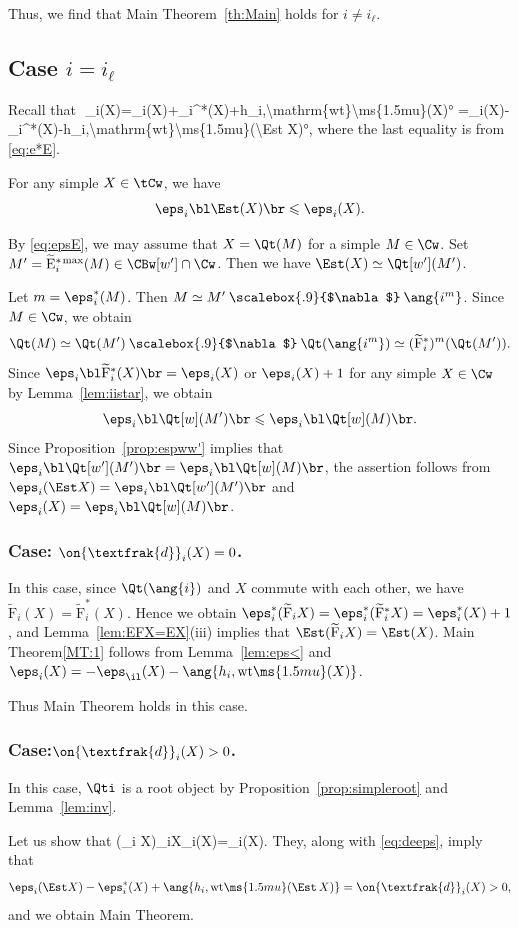 \documentclass[12pt,leqno]{amsart}%
\renewcommand{\le}{\leqslant}
\theoremstyle{plain}
\theoremstyle{definition}
\newcommand{\hconv}{\mathbin{\scalebox{.9}{$\nabla$}}}
\newcommand{\de}{\on{\textfrak{d}}}
\newcommand{\wt}{\mathrm{wt}\ms{1.5mu}} 		%
\newcommand{\tF}{\widetilde{\mathrm{F}}} 		%
\newcommand{\tEsm}{\widetilde{\mathrm{E}}^{*{ \hskip 0.1em  \rm max}}}  		%
\numberwithin{equation}{section}
\begin{document}
Thus, we find that Main Theorem~\ref{th:Main} holds for $i\not=i_\ell$.


\subsection{Case $i=i_\ell$}
 Recall that
\eq
\,\,\qquad\de_i(X)=\eps_i(X)+\eps_i^*(X)+\ang{h_i,\wt(X)}
=\eps_i(X)-\bl\eps_i^*(X)-\ang{h_i,\wt(\Est X)}\br,
\label{eq:deeps}
\eneq
where the last equality is from \eqref{eq:e*E}.

\Lemma\label{lem:eps<}
For any simple $X\in\tCw$, we have
$$\eps_i\bl\Est(X)\br\le\eps_i(X).$$
\enlemma
\Proof

By \eqref{eq:epsE}, we may assume that $X=\Qt(M)$ for a simple $M\in\Cw$.
Set $M'=\tEsm_{i}(M)\in\CBw[w']\cap\Cw$.
Then we have $\Est(X)\simeq\Qt[w'](M')$.

Let $m=\eps_i^*(M)$.
Then $M\simeq M'\hconv\ang{i^m}$.
Since $M\in\Cw$, we obtain
$$\Qt(M)\simeq\Qt(M')\hconv \Qt(\ang{i^m})\simeq(\tF^*_i)^m(\Qt(M')).$$
Since $\eps_i\bl\tF_i^*(X)\br=\eps_i(X)$ or $\eps_i(X)+1$
for any simple $X\in\Cw$ by Lemma~\ref{lem:iistar},
we obtain
$$\eps_i\bl\Qt[w](M')\br\le\eps_i\bl\Qt[w](M)\br.$$
Since  Proposition~\ref{prop:espww'}
implies that $\eps_i\bl\Qt[w'](M')\br=\eps_i\bl\Qt[w](M)\br$,
the assertion follows from
$\eps_i(\Est X)=\eps_i\bl\Qt[w'](M')\br$
and
$\eps_i(X)=\eps_i\bl\Qt[w](M)\br$.
\QED

\subsubsection{{\rm Case:} $\de_i(X)=0$.}
In this case, since $\Qt(\ang{i})$ and $X$ commute with each other, we have 
$\tF_i(X)=\tF^*_i(X)$.
Hence we obtain
$\eps_i^*(\tF_i X)=\eps_i^*(\tF^*_i X)=\eps_i^*(X)+1$,
and Lemma~\ref{lem:EFX=EX}\;(iii)
implies that $\Est(\tF_i X)=\Est (X)$.
Main Theorem\;\eqref{MT:1}
follows from Lemma~\ref{lem:eps<} and $\eps_i(X)=-\eps_\il(X)-\ang{h_i,\wt(X)}$.

Thus Main Theorem holds in this case.



\subsubsection{{\rm Case:}\;$\de_i(X)>0$.}
In this case,
$\Qti$ is a root object by
Proposition~\ref{prop:simpleroot} and Lemma~\ref{lem:inv}.


Let us show that
\eq
\Est(\tF_i X)\simeq\tF_i\bl\Est X\br\qtq\eps_i(X)=\eps_i(\Est X).
\label{eq:red}
\eneq
They, along with \eqref{eq:deeps}, imply that
$$\eps_i(\Est X)-\eps^*_i(X)+\ang{h_i,\wt (\Est\,X)}=\de_i(X)>0,$$
and we obtain Main Theorem.
\end{document}
